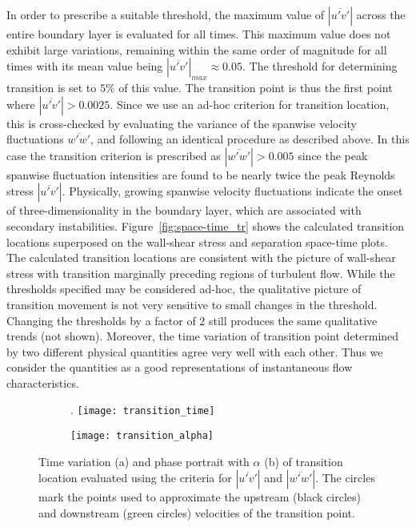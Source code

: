 In order to prescribe a suitable threshold, the maximum value of $|\overline{u'v'}|$ across the entire boundary layer is evaluated for all times. This maximum value does not exhibit large variations, remaining within the same order of magnitude for all times with its mean value being $|\overline{u'v'}|_{max}\approx0.05$. The threshold for determining transition is set to $5\%$ of this value. The transition point is thus the first point where $|\overline{u'v'}|>0.0025$. Since we use an ad-hoc criterion for transition location, this is cross-checked by evaluating the variance of the spanwise velocity fluctuations $\overline{w'w'}$, and following an identical procedure as described above. In this case the transition criterion is prescribed as $|\overline{w'w'}|>0.005$ since the peak spanwise fluctuation intensities are found to be nearly twice the peak Reynolds stress $|\overline{u'v'}|$. Physically, growing spanwise velocity fluctuations indicate the onset of three-dimensionality in the boundary layer, which are associated with secondary instabilities. Figure~\ref{fig:space-time_tr} shows the calculated transition locations superposed on the wall-shear stress and separation space-time plots. The calculated transition locations are consistent with the picture of wall-shear stress with transition marginally preceding regions of turbulent flow. While the thresholds specified may be considered ad-hoc, the qualitative picture of transition movement is not very sensitive to small changes in the threshold. Changing the thresholds by a factor of 2 still produces the same qualitative trends (not shown). Moreover, the time variation of transition point determined by two different physical quantities agree very well with each other. Thus we consider the quantities as a good representations of instantaneous flow characteristics.
\begin{figure}[h]
	\centering
	\begin{subfigure}[t]{0.45\textwidth}
		\centering
		\caption{}. 
		\texttt{[image: transition\_time]}
		\label{fig:transition_time}
	\end{subfigure}
	\begin{subfigure}[t]{0.45\textwidth}
		\centering
		\caption{} 		
		\texttt{[image: transition\_alpha]}
		\label{fig:transition_alpha}
	\end{subfigure}
	\caption{Time variation (a) and phase portrait with $\alpha$ (b) of transition location evaluated using the criteria for $|\overline{u'v'}|$ and $|\overline{w'w'}|$. The circles mark the points used to approximate the upstream (black circles) and downstream (green circles) velocities of the transition point.}
	\label{fig:transition}
\end{figure}

